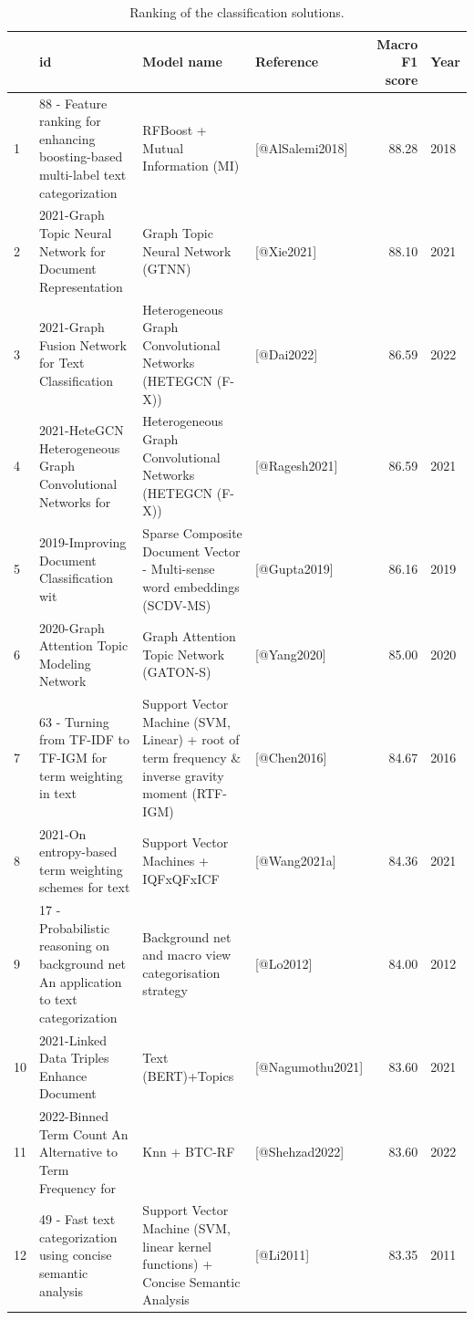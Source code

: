 \documentclass[
]{article}
\begin{document}
\begin{table}

\caption{\label{tab:extrAnaMaF5}Ranking of the classification solutions.}
\centering
\begin{tabular}[t]{l|l|l|l|r|l}
\hline
  & id & Model name & Reference & Macro F1 score & Year\\
\hline
1 & 88 - Feature ranking for enhancing boosting-based multi-label text categorization & RFBoost + Mutual Information (MI) & [@AlSalemi2018] & 88.28 & 2018\\
\hline
2 & 2021-Graph Topic Neural Network for Document Representation & Graph Topic Neural Network  (GTNN) & [@Xie2021] & 88.10 & 2021\\
\hline
3 & 2021-Graph Fusion Network for Text Classification & Heterogeneous Graph Convolutional Networks (HETEGCN (F-X)) & [@Dai2022] & 86.59 & 2022\\
\hline
4 & 2021-HeteGCN Heterogeneous Graph Convolutional Networks for & Heterogeneous Graph Convolutional Networks (HETEGCN (F-X)) & [@Ragesh2021] & 86.59 & 2021\\
\hline
5 & 2019-Improving Document Classification wit & Sparse Composite Document Vector - Multi-sense word embeddings (SCDV-MS) & [@Gupta2019] & 86.16 & 2019\\
\hline
6 & 2020-Graph Attention Topic Modeling Network & Graph Attention Topic Network (GATON-S) & [@Yang2020] & 85.00 & 2020\\
\hline
7 & 63 - Turning from TF-IDF to TF-IGM for term weighting in text & Support Vector Machine (SVM, Linear) + root of term frequency \& inverse gravity moment (RTF-IGM) & [@Chen2016] & 84.67 & 2016\\
\hline
8 & 2021-On entropy-based term weighting schemes for text & Support Vector Machines + IQFxQFxICF & [@Wang2021a] & 84.36 & 2021\\
\hline
9 & 17 - Probabilistic reasoning on background net An application to text categorization & Background net and macro view categorisation strategy & [@Lo2012] & 84.00 & 2012\\
\hline
10 & 2021-Linked Data Triples Enhance Document & Text (BERT)+Topics & [@Nagumothu2021] & 83.60 & 2021\\
\hline
11 & 2022-Binned Term Count An Alternative to Term Frequency for & Knn + BTC-RF & [@Shehzad2022] & 83.60 & 2022\\
\hline
12 & 49 - Fast text categorization using concise semantic analysis & Support Vector Machine (SVM, linear kernel functions) + Concise Semantic Analysis & [@Li2011] & 83.35 & 2011\\

\end{tabular}
\end{table}
\end{document}
